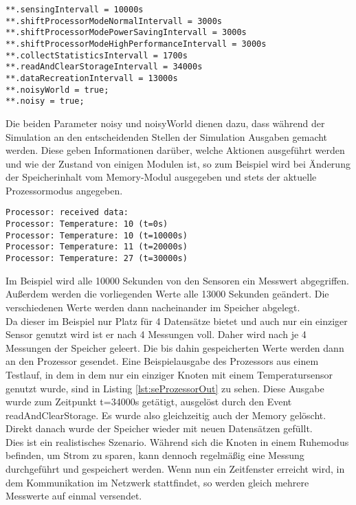 \begin{minipage}{\textwidth}
\begin{lstlisting}[language=ned,caption={Parameter für das Beispiel SensorExample},label=lst:sePar]
**.sensingIntervall = 10000s
**.shiftProcessorModeNormalIntervall = 3000s
**.shiftProcessorModePowerSavingIntervall = 3000s
**.shiftProcessorModeHighPerformanceIntervall = 3000s
**.collectStatisticsIntervall = 1700s
**.readAndClearStorageIntervall = 34000s
**.dataRecreationIntervall = 13000s
**.noisyWorld = true;
**.noisy = true; 
\end{lstlisting}
\end{minipage}
Die beiden Parameter noisy und noisyWorld dienen dazu, dass während der Simulation an den entscheidenden Stellen der Simulation Ausgaben gemacht werden. Diese geben Informationen darüber, welche Aktionen ausgeführt werden und wie der Zustand von einigen Modulen ist, so zum Beispiel wird bei Änderung der Speicherinhalt vom Memory-Modul ausgegeben und stets der aktuelle Prozessormodus angegeben.\\
\begin{minipage}{\textwidth}
\begin{lstlisting}[language=ned,caption={Ausgabe des Speicherinhalts durch den Prozessor bei t=40000s},label=lst:seProzessorOut]
Processor: received data:
Processor: Temperature: 10 (t=0s)
Processor: Temperature: 10 (t=10000s)
Processor: Temperature: 11 (t=20000s)
Processor: Temperature: 27 (t=30000s)
\end{lstlisting}
\end{minipage}
Im Beispiel wird alle 10000 Sekunden von den Sensoren ein Messwert abgegriffen. Außerdem werden die vorliegenden Werte alle 13000 Sekunden geändert. Die verschiedenen Werte werden dann nacheinander im Speicher abgelegt.\\
Da dieser im Beispiel nur Platz für 4 Datensätze bietet und auch nur ein einziger Sensor genutzt wird ist er nach 4 Messungen voll. Daher wird nach je 4 Messungen der Speicher geleert. Die bis dahin gespeicherten Werte werden dann an den Prozessor gesendet. Eine Beispielausgabe des Prozessors aus einem Testlauf, in dem in dem nur ein einziger Knoten mit einem Temperatursensor genutzt wurde, sind in Listing \ref{lst:seProzessorOut} zu sehen. Diese Ausgabe wurde zum Zeitpunkt t=34000s getätigt, ausgelöst durch den Event readAndClearStorage. Es wurde also gleichzeitig auch der Memory gelöscht. Direkt danach wurde der Speicher wieder mit neuen Datensätzen gefüllt.\\
Dies ist ein realistisches Szenario. Während sich die Knoten in einem Ruhemodus befinden, um Strom zu sparen, kann dennoch regelmäßig eine Messung durchgeführt und gespeichert werden. Wenn nun ein Zeitfenster erreicht wird, in dem Kommunikation im Netzwerk stattfindet, so werden gleich mehrere Messwerte auf einmal versendet.

